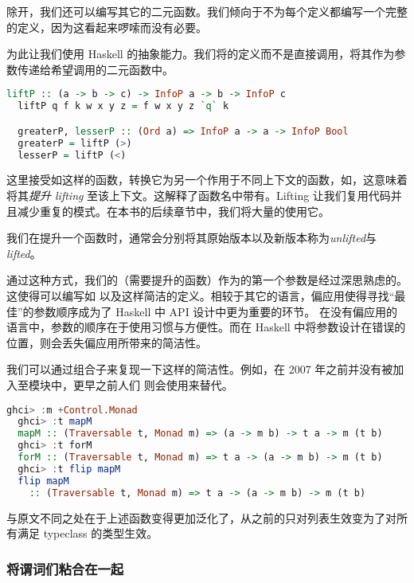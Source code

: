 \documentclass[./main.tex]{subfiles}
\begin{document}
除开，我们还可以编写其它的二元函数。我们倾向于不为每个定义都编写一个完整的定义，因为这看起来啰嗦而没有必要。

为此让我们使用 Haskell 的抽象能力。我们将的定义而不是直接调用\acode{(==)}，将其作为参数传递给希望调用的二元函数中。

\begin{lstlisting}[language=Haskell]
  liftP :: (a -> b -> c) -> InfoP a -> b -> InfoP c
  liftP q f k w x y z = f w x y z `q` k

  greaterP, lesserP :: (Ord a) => InfoP a -> a -> InfoP Bool
  greaterP = liftP (>)
  lesserP = liftP (<)
\end{lstlisting}

这里接受如\acode{(>)}这样的函数，转换它为另一个作用于不同上下文的函数，如，这意味着将其\textit{提升 lifting}
至该上下文。这解释了函数名中带有。Lifting 让我们复用代码并且减少重复的模式。在本书的后续章节中，我们将大量的使用它。

我们在提升一个函数时，通常会分别将其原始版本以及新版本称为\textit{unlifted}与\textit{lifted}。

通过这种方式，我们的（需要提升的函数）作为的第一个参数是经过深思熟虑的。这使得可以编写如
以及这样简洁的定义。相较于其它的语言，偏应用使得寻找“最佳”的参数顺序成为了 Haskell 中 API 设计中更为重要的环节。
在没有偏应用的语言中，参数的顺序在于使用习惯与方便性。而在 Haskell 中将参数设计在错误的位置，则会丢失偏应用所带来的简洁性。

我们可以通过组合子来复现一下这样的简洁性。例如，在 2007 年之前并没有被加入至模块中，更早之前人们
则会使用来替代。

\begin{lstlisting}[language=Haskell]
  ghci> :m +Control.Monad
  ghci> :t mapM
  mapM :: (Traversable t, Monad m) => (a -> m b) -> t a -> m (t b)
  ghci> :t forM
  forM :: (Traversable t, Monad m) => t a -> (a -> m b) -> m (t b)
  ghci> :t flip mapM
  flip mapM
    :: (Traversable t, Monad m) => t a -> (a -> m b) -> m (t b)
\end{lstlisting}

与原文不同之处在于上述函数变得更加泛化了，从之前的只对列表生效变为了对所有满足 typeclass 的类型生效。

\subsubsection*{将谓词们粘合在一起}
\end{document}
